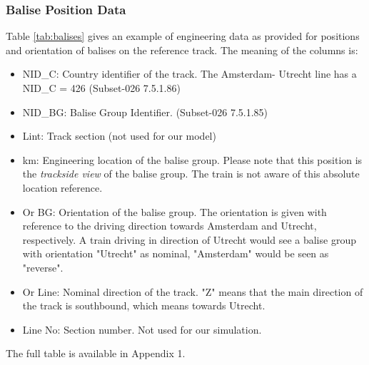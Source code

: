 \documentclass{template/openetcs_article}
\begin{document}
\subsubsection{Balise Position Data}

Table \ref {tab:balises} gives an example of engineering data as provided for positions and orientation of balises on the reference track.
The meaning of the columns is:
\begin{itemize}
 \item NID\_C: Country identifier of the track. The Amsterdam- Utrecht line has a NID\_C = 426 (Subset-026 7.5.1.86)\cite{SRS026-7}
 \item NID\_BG: Balise Group Identifier. (Subset-026 7.5.1.85)\cite{SRS026-7}
 \item Lint: Track section (not used for our model)
 \item km: Engineering location of the balise group. Please note that this position is the \emph{trackside view} of the balise group. The train is not aware of this absolute location reference.
 \item Or BG: Orientation of the balise group. The orientation is given with reference to the driving direction towards Amsterdam and Utrecht, respectively. A train driving in direction of Utrecht would see a balise group with orientation "Utrecht" as nominal, "Amsterdam" would be seen as "reverse".
 \item Or Line: Nominal direction of the track. "Z" means that the main direction of the track is southbound, which means towards Utrecht.
 \item Line No: Section number. Not used for our simulation.
 \end {itemize}

The full table is available in Appendix 1.
\end{document}
